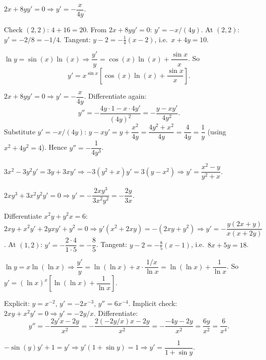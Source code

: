 \begin{solutions}
  \item $2x+8yy'=0\Rightarrow y'=-\dfrac{x}{4y}$.

  \item Check $(2,2)$: $4+16=20$. From $2x+8yy'=0$: $y'=-x/(4y)$. At
        $(2,2)$: $y'=-2/8=-1/4$. Tangent: $y-2=-\tfrac14(x-2)$, i.e.\
        $x+4y=10$.

  \item $\ln y=\sin(x)\ln(x)\Rightarrow\dfrac{y'}{y}=\cos(x)\ln(x)+\dfrac{\sin x}{x}$.
        So
        \[
          y'=x^{\sin x}\left[\cos(x)\ln(x)+\frac{\sin x}{x}\right] .
        \]

  \item $2x+8yy'=0\Rightarrow y'=-\dfrac{x}{4y}$. Differentiate again:
        \[
          y''=-\frac{4y\cdot 1-x\cdot 4y'}{(4y)^{2}}=-\frac{y-xy'}{4y^{2}} .
        \]
        Substitute $y'=-x/(4y)$:
        $y-xy'=y+\dfrac{x^{2}}{4y}=\dfrac{4y^{2}+x^{2}}{4y}=\dfrac{4}{4y}
        =\dfrac{1}{y}$ (using $x^{2}+4y^{2}=4$). Hence
        $y''=-\dfrac{1}{4y^{3}}$.

  \item $3x^{2}-3y^{2}y'=3y+3xy'\Rightarrow -3(y^{2}+x)y'=3(y-x^{2})
        \Rightarrow y'=\dfrac{x^{2}-y}{y^{2}+x}$.

  \item $2xy^{3}+3x^{2}y^{2}y'=0\Rightarrow
        y'=-\dfrac{2xy^{3}}{3x^{2}y^{2}}=-\dfrac{2y}{3x}$.

  \item Differentiate $x^{2}y+y^{2}x=6$: $2xy+x^{2}y'+2yxy'+y^{2}=0
        \Rightarrow y'(x^{2}+2xy)=-(2xy+y^{2})
        \Rightarrow y'=-\dfrac{y(2x+y)}{x(x+2y)}$. At $(1,2)$:
        $y'=-\dfrac{2\cdot 4}{1\cdot 5}=-\dfrac{8}{5}$. Tangent:
        $y-2=-\tfrac85(x-1)$, i.e.\ $8x+5y=18$.

  \item $\ln y=x\ln(\ln x)\Rightarrow\dfrac{y'}{y}=\ln(\ln x)+x\cdot
        \dfrac{1/x}{\ln x}=\ln(\ln x)+\dfrac{1}{\ln x}$. So
        $y'=(\ln x)^{x}\left[\ln(\ln x)+\dfrac{1}{\ln x}\right]$.

  \item Explicit: $y=x^{-2}$, $y'=-2x^{-3}$, $y''=6x^{-4}$. Implicit
        check: $2xy+x^{2}y'=0\Rightarrow y'=-2y/x$. Differentiate:
        \[
          y''=-\frac{2y'x-2y}{x^{2}}=-\frac{2(-2y/x)x-2y}{x^{2}}
             =-\frac{-4y-2y}{x^{2}}=\frac{6y}{x^{2}}=\frac{6}{x^{4}} .
        \]

  \item $-\sin(y)y'+1=y'\Rightarrow y'(1+\sin y)=1\Rightarrow
        y'=\dfrac{1}{1+\sin y}$.


\end{solutions}
